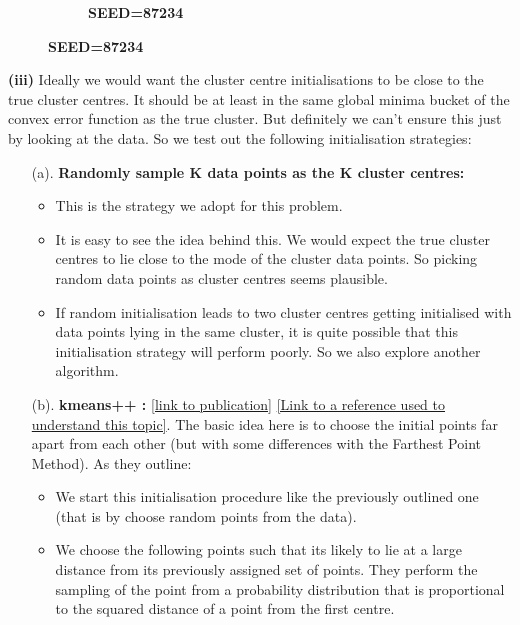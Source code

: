 \documentclass[11pt]{article}
\begin{document}
\begin{figure}[H]
\begin{subfigure}{0.33\linewidth}
        \caption{\textbf{SEED=87234}}
    \end{subfigure}    
\end{figure}

\textbf{(iii)} Ideally we would want the cluster centre initialisations to be close to the true cluster centres. It should be at least in the same global minima bucket of the convex error function as the true cluster. But definitely we can't ensure this just by looking at the data. So we test out the following initialisation strategies:
\begin{itemize}
    \item[(a). ] \textbf{Randomly sample K data points as the K cluster centres:} 
        \begin{itemize}
            \item This is the strategy we adopt for this problem.
            
            \item It is easy to see the idea behind this. We would expect the true cluster centres to lie close to the mode of the cluster data points. So picking random data points as cluster centres seems plausible. 
            
            \item If random initialisation leads to two cluster centres getting initialised with data points lying in the same cluster, it is quite possible that this initialisation strategy will perform poorly. So we also explore another algorithm.  
        \end{itemize}
    
    \item[(b). ] \textbf{kmeans++ :} \href{https://theory.stanford.edu/~sergei/papers/kMeansPP-soda.pdf}{[link to publication]} \href{https://medium.com/analytics-vidhya/comparison-of-initialization-strategies-for-k-means-d5ddd8b0350e#:~:text=using%20this%20method.-,kmeans%2B%2B,-This%20is%20a}{[Link to a reference used to understand this topic]}. The basic idea here is to choose the initial points far apart from each other (but with some differences with the Farthest Point Method). As they outline:
        \begin{itemize}
            \item We start this initialisation procedure like the previously outlined one (that is by choose random points from the data). 
            
            \item We choose the following points such that its likely to lie at a large distance from its previously assigned set of points. They perform the sampling of the point from a probability distribution that is proportional to the squared distance of a point from the first centre.
            

\end{itemize}
\end{itemize}
\end{document}
